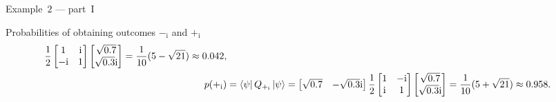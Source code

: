 \begin{frame}{Example~$2$ --- part~I}
\begin{block}{Probabilities of obtaining outcomes $-_\mathrm{i}$ and 
                $+_\mathrm{i}$}
\begin{equation*}
\begin{split}
                        \frac{1}{2}
                        \begin{bmatrix}
                            1 & \mathrm{i}\\
                            -\mathrm{i} & 1
                        \end{bmatrix}
                        \begin{bmatrix}
                            \sqrt{0.7} \\
                            \sqrt{0.3}\mathrm{i}
                        \end{bmatrix}
                        = \frac{1}{10} (5-\sqrt{21})
                        \approx 0.042,  \\
                        p(+_\mathrm{i}) &= \bra{\psi} Q_{+_\mathrm{i}} \ket{\psi} = 
                        \begin{bmatrix}
                            \sqrt{0.7} & -\sqrt{0.3}\mathrm{i}
                        \end{bmatrix}
                        \frac{1}{2}
                        \begin{bmatrix}
                            1 & -\mathrm{i}\\
                            \mathrm{i} & 1
                        \end{bmatrix}
                        \begin{bmatrix}
                            \sqrt{0.7} \\
                            \sqrt{0.3}\mathrm{i}
                        \end{bmatrix}
                        = \frac{1}{10} (5+\sqrt{21})
                        \approx 0.958.
                    \end{split}
                \end{equation*}
            \end{block}
        \end{frame}
